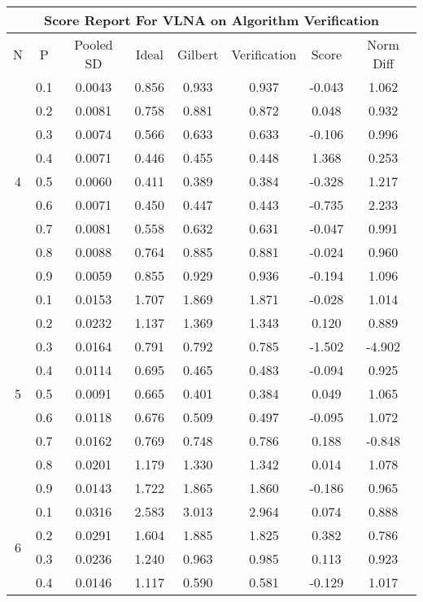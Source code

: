 \documentclass[11pt,a4paper]{report}
\begin{document}
\begin{longtable}{ | c | c || c | c | c | c | c | c | }
\hline
\multicolumn{8}{|c|}{ Score Report For VLNA on Algorithm Verification} \\
\hline
N & P & Pooled SD &  Ideal &  Gilbert & Verification  & Score & Norm Diff \\
 \hline
 \hline
 \endhead
\multirow{9}{*}{4} & 0.1 & 0.0043 & 0.856 & 0.933 & 0.937 & -0.043 & 1.062 \\
 & 0.2 & 0.0081 & 0.758 & 0.881 & 0.872 & 0.048 & 0.932 \\
 & 0.3 & 0.0074 & 0.566 & 0.633 & 0.633 & -0.106 & 0.996 \\
 & 0.4 & 0.0071 & 0.446 & 0.455 & 0.448 & 1.368 & 0.253 \\
 & 0.5 & 0.0060 & 0.411 & 0.389 & 0.384 & -0.328 & 1.217 \\
 & 0.6 & 0.0071 & 0.450 & 0.447 & 0.443 & -0.735 & 2.233 \\
 & 0.7 & 0.0081 & 0.558 & 0.632 & 0.631 & -0.047 & 0.991 \\
 & 0.8 & 0.0088 & 0.764 & 0.885 & 0.881 & -0.024 & 0.960 \\
 & 0.9 & 0.0059 & 0.855 & 0.929 & 0.936 & -0.194 & 1.096 \\
 \hline
\multirow{9}{*}{5} & 0.1 & 0.0153 & 1.707 & 1.869 & 1.871 & -0.028 & 1.014 \\
 & 0.2 & 0.0232 & 1.137 & 1.369 & 1.343 & 0.120 & 0.889 \\
 & 0.3 & 0.0164 & 0.791 & 0.792 & 0.785 & -1.502 & -4.902 \\
 & 0.4 & 0.0114 & 0.695 & 0.465 & 0.483 & -0.094 & 0.925 \\
 & 0.5 & 0.0091 & 0.665 & 0.401 & 0.384 & 0.049 & 1.065 \\
 & 0.6 & 0.0118 & 0.676 & 0.509 & 0.497 & -0.095 & 1.072 \\
 & 0.7 & 0.0162 & 0.769 & 0.748 & 0.786 & 0.188 & -0.848 \\
 & 0.8 & 0.0201 & 1.179 & 1.330 & 1.342 & 0.014 & 1.078 \\
 & 0.9 & 0.0143 & 1.722 & 1.865 & 1.860 & -0.186 & 0.965 \\
 \hline
\multirow{9}{*}{6} & 0.1 & 0.0316 & 2.583 & 3.013 & 2.964 & 0.074 & 0.888 \\
 & 0.2 & 0.0291 & 1.604 & 1.885 & 1.825 & 0.382 & 0.786 \\
 & 0.3 & 0.0236 & 1.240 & 0.963 & 0.985 & 0.113 & 0.923 \\
 & 0.4 & 0.0146 & 1.117 & 0.590 & 0.581 & -0.129 & 1.017 \\

\end{longtable}
\end{document}
